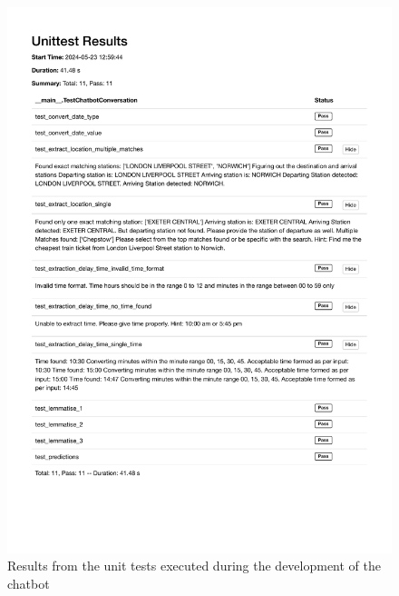 \begin{figure}[!htbp]
    \centering
    \includegraphics[trim = 0 100 0 0, width=\textwidth]{Diagrams/Unit_Test_HTML/Unittest Results.pdf}
    \caption{Results from the unit tests executed during the development of the chatbot}
    \label{Fig: unit test results}
\end{figure}